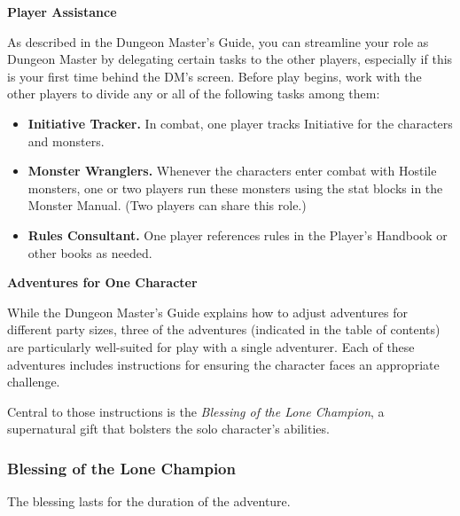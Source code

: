 \documentclass[letterpaper, 11pt, twocolumn]{dndbook}
\begin{document}
\textbf{Player Assistance}

As described in the Dungeon Master's Guide, you can streamline your role as Dungeon Master by delegating certain tasks to the other players, especially if this is your first time behind the DM's screen. Before play begins, work with the other players to divide any or all of the following tasks among them:

\begin{itemize}
\item \textbf{Initiative Tracker.} In combat, one player tracks Initiative for the characters and monsters.
\item \textbf{Monster Wranglers.} Whenever the characters enter combat with Hostile monsters, one or two players run these monsters using the stat blocks in the Monster Manual. (Two players can share this role.)
\item \textbf{Rules Consultant.} One player references rules in the Player's Handbook or other books as needed.
\end{itemize}

\textbf{Adventures for One Character}

While the Dungeon Master's Guide explains how to adjust adventures for different party sizes, three of the adventures (indicated in the table of contents) are particularly well-suited for play with a single adventurer. Each of these adventures includes instructions for ensuring the character faces an appropriate challenge.

Central to those instructions is the \textit{Blessing of the Lone Champion}, a supernatural gift that bolsters the solo character's abilities.

\subsubsection{Blessing of the Lone Champion}

The blessing lasts for the duration of the adventure.
\end{document}
